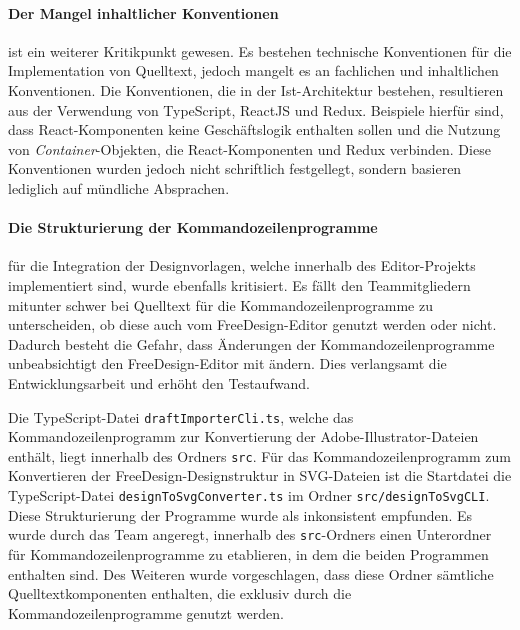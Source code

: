 \paragraph{Der Mangel inhaltlicher Konventionen} ist ein weiterer Kritikpunkt gewesen. Es bestehen technische Konventionen für die Implementation von Quelltext, jedoch mangelt es an fachlichen und inhaltlichen Konventionen. Die Konventionen, die in der Ist-Architektur bestehen, resultieren aus der Verwendung von TypeScript, ReactJS und Redux. Beispiele hierfür sind, dass React-Komponenten keine Geschäftslogik enthalten sollen und die Nutzung von \emph{Container}-Objekten, die React-Komponenten und Redux verbinden.
Diese Konventionen wurden jedoch nicht schriftlich festgellegt, sondern basieren lediglich auf mündliche Absprachen. 

\paragraph{Die Strukturierung der Kommandozeilenprogramme} für die Integration der Designvorlagen, welche innerhalb des Editor-Projekts implementiert sind, wurde ebenfalls kritisiert.
Es fällt den Teammitgliedern mitunter schwer bei Quelltext für die Kommandozeilenprogramme zu unterscheiden, ob diese auch vom FreeDesign-Editor genutzt werden oder nicht. Dadurch besteht die Gefahr, dass Änderungen der Kommandozeilenprogramme unbeabsichtigt den FreeDesign-Editor mit ändern. Dies verlangsamt die Entwicklungsarbeit und erhöht den Testaufwand.

Die TypeScript-Datei \lstinline|draftImporterCli.ts|, welche das Kommandozeilenprogramm zur Konvertierung der Adobe-Illustrator-Dateien enthält, liegt innerhalb des Ordners \lstinline|src|. Für das Kommandozeilenprogramm zum Konvertieren der FreeDesign-Designstruktur in SVG-Dateien ist die Startdatei die TypeScript-Datei \lstinline|designToSvgConverter.ts| im Ordner \lstinline|src/designToSvgCLI|. Diese Strukturierung der Programme wurde als inkonsistent empfunden. 
Es wurde durch das Team angeregt, innerhalb des \lstinline|src|-Ordners einen Unterordner für Kommandozeilenprogramme zu etablieren, in dem die beiden Programmen enthalten sind. Des Weiteren wurde vorgeschlagen, dass diese Ordner sämtliche Quelltextkomponenten enthalten, die exklusiv durch die Kommandozeilenprogramme genutzt werden.  

